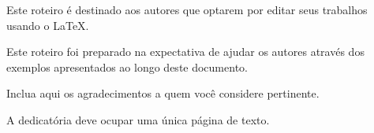 

\noindent%
Este roteiro é destinado aos autores que optarem por editar seus trabalhos usando o \LaTeX .

\noindent%
Este roteiro foi preparado na expectativa de ajudar os autores através dos exemplos apresentados ao longo deste documento.

\noindent%
Inclua aqui os agradecimentos a quem você considere pertinente.

\noindent%
A dedicatória deve ocupar uma única página de texto.
\vfill
